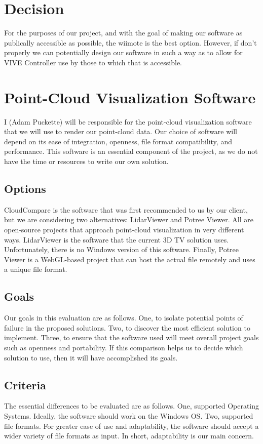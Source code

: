 \documentclass{article}
\begin{document}
\section{Decision}
For the purposes of our project, and with the goal of making our software as publically accessible as possible, the wiimote is the best option.
However, if don't properly we can potentially design our software in such a way as to allow for VIVE Controller use by those to which that is accessible. 

\section{Point-Cloud Visualization Software}
I (Adam Puckette) will be responsible for the point-cloud visualization software that we will use to render our point-cloud data. 
Our choice of software will depend on its ease of integration, openness, file format compatibility, and performance. 
This software is an essential component of the project, as we do not have the time or resources to write our own solution. 

\subsection{Options}
CloudCompare is the software that was first recommended to us by our client, but we are considering two alternatives: LidarViewer and Potree Viewer. 
All are open-source projects that approach point-cloud visualization in very different ways. 
LidarViewer is the software that the current 3D TV solution uses. 
Unfortunately, there is no Windows version of this software. 
Finally, Potree Viewer is a WebGL-based project that can host the actual file remotely and uses a unique file format.

\subsection{Goals}
Our goals in this evaluation are as follows. 
One, to isolate potential points of failure in the proposed solutions. 
Two, to discover the most efficient solution to implement. 
Three, to ensure that the software used will meet overall project goals such as openness and portability. 
If this comparison helps us to decide which solution to use, then it will have accomplished its goals.

\subsection{Criteria}
The essential differences to be evaluated are as follows. 
One, supported Operating Systems. Ideally, the software should work on the Windows OS.
Two, supported file formats. For greater ease of use and adaptability, the software should accept a wider variety of file formats as input. In short, adaptability is our main concern.
\end{document}
